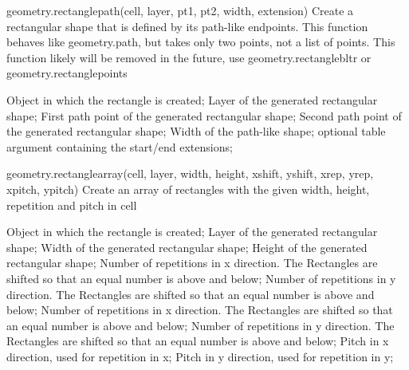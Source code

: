 \begin{APIfunc}{geometry.rectanglepath(cell, layer, pt1, pt2, width, extension)}
    Create a rectangular shape that is defined by its path-like endpoints. This function behaves like geometry.path, but takes only two points, not a list of points. This function likely will be removed in the future, use geometry.rectanglebltr or geometry.rectanglepoints
    \begin{APIparameters}
            Object in which the rectangle is created;
            Layer of the generated rectangular shape;
            First path point of the generated rectangular shape;
            Second path point of the generated rectangular shape;
            Width of the path-like shape;
            optional table argument containing the start/end extensions;
    \end{APIparameters}
\end{APIfunc}
\begin{APIfunc}{geometry.rectanglearray(cell, layer, width, height, xshift, yshift, xrep, yrep, xpitch, ypitch)}
    Create an array of rectangles with the given width, height, repetition and pitch in cell
    \begin{APIparameters}
            Object in which the rectangle is created;
            Layer of the generated rectangular shape;
            Width of the generated rectangular shape;
            Height of the generated rectangular shape;
            Number of repetitions in x direction. The Rectangles are shifted so that an equal number is above and below;
            Number of repetitions in y direction. The Rectangles are shifted so that an equal number is above and below;
            Number of repetitions in x direction. The Rectangles are shifted so that an equal number is above and below;
            Number of repetitions in y direction. The Rectangles are shifted so that an equal number is above and below;
            Pitch in x direction, used for repetition in x;
            Pitch in y direction, used for repetition in y;
    \end{APIparameters}
\end{APIfunc}
